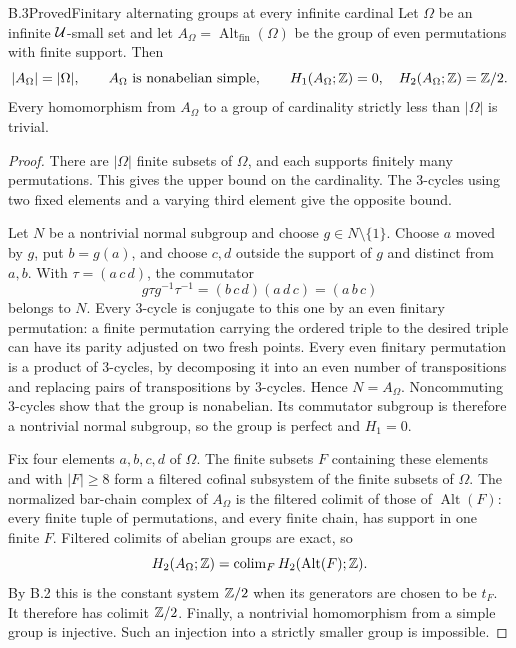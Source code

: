 \begin{claim}{B.3}{Proved}{Finitary alternating groups at every infinite cardinal}
Let $\Omega$ be an infinite $\mathcal U$-small set and let
$A_\Omega=\operatorname{Alt}_{\mathrm{fin}}(\Omega)$ be the group of even
permutations with finite support.  Then
\[
 |A_\Omega|=|\Omega|,\qquad
 A_\Omega\text{ is nonabelian simple},\qquad
 H_1(A_\Omega;\mathbb Z)=0,\quad H_2(A_\Omega;\mathbb Z)=\mathbb Z/2.
\]
Every homomorphism from $A_\Omega$ to a group of cardinality strictly
less than $|\Omega|$ is trivial.
\end{claim}
\begin{proof}
There are $|\Omega|$ finite subsets of $\Omega$, and each supports finitely
many permutations.  This gives the upper bound on the cardinality.  The
3-cycles using two fixed elements and a varying third element give the
opposite bound.

Let $N$ be a nontrivial normal subgroup and choose $g\in N\setminus\{1\}$.
Choose $a$ moved by $g$, put $b=g(a)$, and choose $c,d$ outside the support
of $g$ and distinct from $a,b$.  With $\tau=(a\,c\,d)$, the commutator
\[
 g\tau g^{-1}\tau^{-1}=(b\,c\,d)(a\,d\,c)=(a\,b\,c)
\]
belongs to $N$.  Every 3-cycle is conjugate to this one by an even
finitary permutation: a finite permutation carrying the ordered triple
to the desired triple can have its parity adjusted on two fresh points.
Every even finitary permutation is a product of 3-cycles, by decomposing
it into an even number of transpositions and replacing pairs of
transpositions by 3-cycles.  Hence $N=A_\Omega$.  Noncommuting 3-cycles
show that the group is nonabelian.  Its commutator subgroup is therefore
a nontrivial normal subgroup, so the group is perfect and $H_1=0$.

Fix four elements $a,b,c,d$ of $\Omega$.  The finite subsets $F$ containing
these elements and with $|F|\geq8$ form a filtered cofinal subsystem of
the finite subsets of $\Omega$.  The normalized bar-chain complex of
$A_\Omega$ is the filtered colimit of those of $\operatorname{Alt}(F)$:
every finite tuple of permutations, and every finite chain, has support
in one finite $F$.  Filtered colimits of abelian groups are exact, so
\[
 H_2(A_\Omega;\mathbb Z)
   =\operatorname{colim}_F H_2(\operatorname{Alt}(F);\mathbb Z).
\]
By B.2 this is the constant system $\mathbb Z/2$ when its generators are chosen
to be $t_F$.  It therefore has colimit $\mathbb Z/2$.  Finally, a nontrivial
homomorphism from a simple group is injective.  Such an injection into a
strictly smaller group is impossible.
\end{proof}

